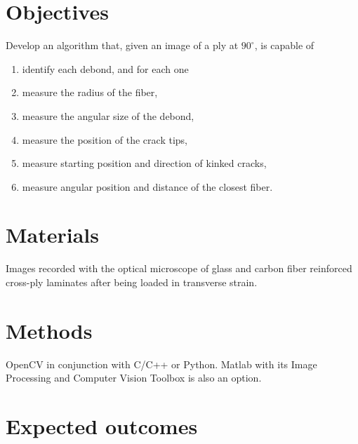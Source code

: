 \documentclass[review]{elsarticle}
\begin{document}
\section{Objectives}

Develop an algorithm that, given an image of a ply at $90^{\circ}$, is capable of

\begin{enumerate}
\item identify each debond, and for each one
\item measure the radius of the fiber,
\item measure the angular size of the debond,
\item measure the position of the crack tips,
\item measure starting position and direction of kinked cracks,
\item measure angular position and distance of the closest fiber.
\end{enumerate}

\section{Materials}

Images recorded with the optical microscope of glass and carbon fiber reinforced cross-ply laminates after being loaded in transverse strain.

\section{Methods}

OpenCV in conjunction with C/C++ or Python. Matlab with its Image Processing and Computer Vision Toolbox is also an option.

\section{Expected outcomes}
\end{document}
